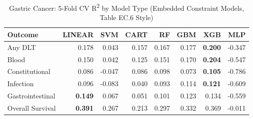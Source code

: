 \begin{table}[ht]
\centering
\caption{Gastric Cancer: 5-Fold CV R\textsuperscript{2} by Model Type (Embedded Constraint Models, Table EC.6 Style)}
\begin{tabular}{lrrrrrrr}
\toprule
Outcome & LINEAR & SVM & CART & RF & GBM & XGB & MLP \\
\midrule
Any DLT & 0.178 & 0.043 & 0.157 & 0.167 & 0.177 & \textbf{0.200} & -0.347 \\
Blood & 0.150 & 0.042 & 0.125 & 0.151 & 0.170 & \textbf{0.204} & -0.547 \\
Constitutional & 0.086 & -0.047 & 0.086 & 0.098 & 0.073 & \textbf{0.105} & -0.786 \\
Infection & 0.096 & -0.083 & 0.040 & 0.093 & 0.114 & \textbf{0.121} & -0.609 \\
Gastrointestinal & \textbf{0.149} & 0.067 & 0.051 & 0.101 & 0.123 & 0.134 & -0.559 \\
Overall Survival & \textbf{0.391} & 0.267 & 0.213 & 0.297 & 0.332 & 0.369 & -0.011 \\
\bottomrule
\end{tabular}
\end{table}